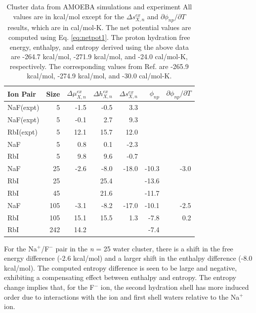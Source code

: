 \begin{cpa}
  \begin{table}
   \begin{center}
    \begin{tabular}{lrrrrrr}
     \hline
     \hline
      Ion Pair & Size & $\Delta\mu^{ex}_{X,n}$ & $\Delta h^{ex}_{X,n}$ & $\Delta s^{ex}_{X,n}$ 
      & $\phi_{np}$  & $\partial \phi_{np} / \partial T$ \\
     \hline
      NaF(expt\cite{donald2010expand_cpa}) & 5 & -1.5 & -0.5 & 3.3   & & \\
      NaF(expt\cite{coe1998cpa1}) & 5 & -0.1 & 2.7 & 9.3   &  & \\
      RbI(expt\cite{coe1998cpa1,donald2010expand_cpa}) & 5 & 12.1 & 15.7 & 12.0   &  & \\
      NaF & 5 & 0.8 & 0.1 & -2.3 & &  \\
      RbI & 5 & 9.8 & 9.6 & -0.7 & &  \\
      NaF & 25 & -2.6 & -8.0 & -18.0 & -10.3 & -3.0 \\
      RbI & 25 & & 25.4 & &   -13.6 & \\
      RbI & 45 & & 21.6 & &  -11.7  & \\
      NaF & 105 & -3.1 & -8.2 & -17.0 & -10.1  & -2.5 \\
      RbI & 105 & 15.1 & 15.5 & 1.3 &  -7.8 & 0.2 \\
      RbI & 242 & 14.2 &     & &  -7.4      & \\
     \hline
     \hline
    \end{tabular}
   \end{center}
   \caption[Cluster data for NaF and RbI pairs]{Cluster data from AMOEBA simulations and experiment\cite{coe1998cpa1,donald2010expand_cpa} All values are in kcal/mol except 
   for the $\Delta s^{ex}_{X,n}$ and $\partial \phi_{np} / \partial T$ results, which are in cal/mol-K. The net potential values are computed using Eq. \ref{eq:netpot1}. 
   The proton hydration free energy, enthalpy, and entropy derived using the above data are -264.7 kcal/mol, -271.9 kcal/mol, and -24.0 cal/mol-K, respectively. The 
   corresponding values from Ref. \cite{coe1998cpa1} are -265.9 kcal/mol, -274.9 kcal/mol, and -30.0 cal/mol-K.}
   \label{tab:clusterdata}
  \end{table}

  For the Na$^+$/F$^-$ pair in the \emph{n} = 25 water cluster, there is a shift in the free energy difference (-2.6 kcal/mol) and a larger shift in the enthalpy difference 
  (-8.0 kcal/mol). The computed entropy difference is seen to be large and negative, exhibiting a compensating effect between enthalpy and entropy.  The entropy change implies 
  that, for the F$^-$ ion, the second hydration shell has more induced order due to interactions with the ion and first shell waters relative to the Na$^+$ ion.


\end{cpa}
